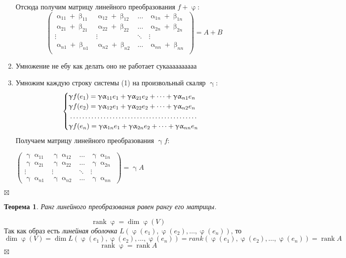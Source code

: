 \documentclass[a4paper, 12pt]{article}
\newtheorem*{theorem}{Теорема}
\newenvironment{Proof}
{\par\noindent{$\blacklozenge$}}
{\hfill$\scriptstyle\boxtimes$}
\newcommand{\rank}{\operatorname{rank}}
\renewcommand{\alpha}{\upalpha}
\renewcommand{\beta}{\upbeta}
\renewcommand{\gamma}{\upgamma}
\renewcommand{\varphi}{\upvarphi}
\begin{document}
\begin{Proof}
\begin{enumerate}
        Отсюда получим матрицу линейного преобразования $f+\varphi$:\\
        $$\begin{pmatrix}
        \alpha_{11}+\beta_{11} & \alpha_{12}+\beta_{12} & \dots & \alpha_{1n}+\beta_{1n}\\
        \alpha_{21}+\beta_{21} & \alpha_{22}+\beta_{22} & \dots & \alpha_{2n}+\beta_{2n}\\
        \vdots & \vdots & \ddots & \vdots\\
        \alpha_{n1}+\beta_{n1} & \alpha_{n2}+\beta_{n2} & \dots & \alpha_{nn}+\beta_{nn}\\
        \end{pmatrix} = A + B$$
        \item Умножение не ебу как делать оно не работает сукаааааааааа
        \item Умножим каждую строку системы (1) на произвольный скаляр $\gamma$:
        $$\begin{cases}
        \gamma f(e_1)=\gamma\alpha_{11}e_1+\gamma \alpha_{21}e_2+\dots+\gamma \alpha_{n1}e_n\\  
        \gamma f(e_2)=\gamma \alpha_{12}e_1+\gamma \alpha_{22}e_2+\dots+\gamma \alpha_{n2}e_n\\ 
        \dotfill\\
        \gamma f(e_n)=\gamma \alpha_{1n}e_1+\gamma \alpha_{2n}e_2+\dots+\gamma \alpha_{nn}e_n\\ 
        \end{cases}$$
        Получаем матрицу линейного преобразования $\gamma f$:
        \begin{center}
        $\begin{pmatrix}
        \gamma \alpha_{11} & \gamma \alpha_{12} & \dots & \gamma \alpha_{1n}\\
        \gamma \alpha_{21} & \gamma \alpha_{22} & \dots & \gamma \alpha_{2n}\\
        \vdots & \vdots & \ddots & \vdots\\
        \gamma \alpha_{n1} & \gamma \alpha_{n2} & \dots & \gamma \alpha_{nn}
        \end{pmatrix} = \gamma A$
        \end{center}
   \end{enumerate}
\end{Proof}
\begin{theorem}
    Ранг линейного преобразования равен рангу его матрицы.
\end{theorem}
\begin{Proof}
$$\rank \varphi = \dim \varphi(V)$$
Так как образ есть \textit{линейная оболочка} $L(\varphi(e_1), \varphi(e_2), \dots, \varphi(e_n))$, то
$$\dim \varphi(V) = \dim L(\varphi(e_1), \varphi(e_2), \dots, \varphi(e_n)) = rank(\varphi(e_1), \varphi(e_2), \dots, \varphi(e_n)) = \rank A$$
$$\rank \varphi = \rank A$$
\end{Proof}\\
\end{document}

